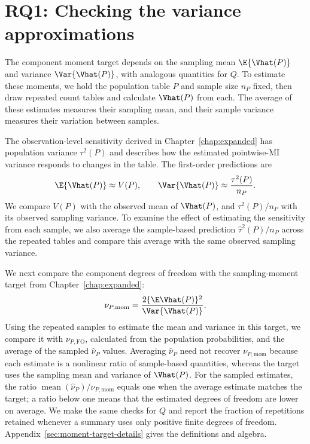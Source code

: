 \section{RQ1: Checking the variance approximations}

The component moment target depends on the sampling mean
\(\E\{\Vhat(P)\}\) and variance \(\Var\{\Vhat(P)\}\), with analogous
quantities for \(Q\). To estimate these moments, we hold the population
table \(P\) and sample size \(n_P\) fixed, then draw repeated count tables
and calculate \(\Vhat(P)\) from each. The average of these estimates
measures their sampling mean, and their sample variance measures their
variation between samples.

The observation-level sensitivity derived in Chapter~\ref{chap:expanded}
has population variance \(\tau^2(P)\) and describes how the estimated
pointwise-MI variance responds to changes in the table. The first-order predictions are
\begin{equation}
 \E\{\Vhat(P)\}\approx V(P),\qquad
 \Var\{\Vhat(P)\}\approx\frac{\tau^2(P)}{n_P}.
 \label{eq:redesign-moment-approximations}
\end{equation}
We compare \(V(P)\) with the observed mean of \(\Vhat(P)\), and
\(\tau^2(P)/n_P\) with its observed sampling variance. To examine the effect of estimating the sensitivity from each sample,
we also average the sample-based prediction \(\widehat\tau^2(P)/n_P\)
across the repeated tables and compare this average with the same observed
sampling variance.

We next compare the component degrees of freedom with the sampling-moment
target from Chapter~\ref{chap:expanded}:
\begin{equation}
 \nu_{P,\mathrm{mom}}
 =\frac{2\{\E\Vhat(P)\}^{2}}{\Var\{\Vhat(P)\}}.
 \label{eq:design-moment-target}
\end{equation}
Using the repeated samples to estimate the mean and variance in this
target, we compare it with \(\nu_{P,\mathrm{FO}}\), calculated from
the population probabilities, and the average of the sampled
\(\widehat\nu_P\) values. Averaging \(\widehat\nu_P\) need not recover
\(\nu_{P,\mathrm{mom}}\) because each estimate is a nonlinear ratio of
sample-based quantities, whereas the target uses the sampling mean and
variance of \(\Vhat(P)\). For the sampled estimates, the ratio
\(\operatorname{mean}(\widehat\nu_P)/\nu_{P,\mathrm{mom}}\) equals one
when the average estimate matches the target; a ratio below one means
that the estimated degrees of freedom are lower on average. We make the
same checks for \(Q\) and report the fraction of repetitions retained
whenever a summary uses only positive finite degrees of freedom.
Appendix~\ref{sec:moment-target-details} gives the definitions and algebra.

